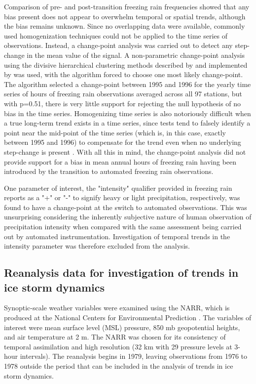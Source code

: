\documentclass[twocol]{ametsoc}
\begin{document}
Comparison of pre- and post-transition freezing rain frequencies showed that any bias present does not appear to overwhelm temporal or spatial trends, although the bias remains unknown. Since no overlapping data were available, commonly used homogenization techniques could not be applied to the time series of observations. Instead, a change-point analysis was carried out to detect any step-change in the mean value of the signal. A non-parametric change-point analysis using the divisive hierarchical clustering methods described by \citet{matteson2014nonparametric} and implemented by \citet{james2013ecp} was used, with the algorithm forced to choose one most likely change-point. The algorithm selected a change-point between 1995 and 1996 for the yearly time series of hours of freezing rain observations averaged across all 97 stations, but with p=0.51, there is very little support for rejecting the null hypothesis of no bias in the time series. Homogenizing time series is also notoriously difficult when a true long-term trend exists in a time series, since tests tend to falsely identify a point near the mid-point of the time series (which is, in this case, exactly between 1995 and 1996) to compensate for the trend even when no underlying step-change is present \citep{gallagher2013changepoint}. With all this in mind, the change-point analysis did not provide support for a bias in mean annual hours of freezing rain having been introduced by the transition to automated freezing rain observations.

One parameter of interest, the "intensity" qualifier provided in freezing rain reports as a "+" or "-" to signify heavy or light precipitation, respectively, was found to have a change-point at the switch to automated observations. This was unsurprising considering the inherently subjective nature of human observation of precipitation intensity when compared with the same assessment being carried out by automated instrumentation. Investigation of temporal trends in the intensity parameter was therefore excluded from the analysis.

\subsection{Reanalysis data for investigation of trends in ice storm dynamics}
Synoptic-scale weather variables were examined using the NARR, which is produced at the National Centers for Environmental Prediction \citep{mesinger2006north}. The variables of interest were mean surface level (MSL) pressure, 850 mb geopotential heights, and air temperature at 2 m. The NARR was chosen for its consistency of temporal assimilation and high resolution (32 km with 29 pressure levels at 3-hour intervals). The reanalysis begins in 1979, leaving observations from 1976 to 1978 outside the period that can be included in the analysis of trends in ice storm dynamics.
\end{document}
